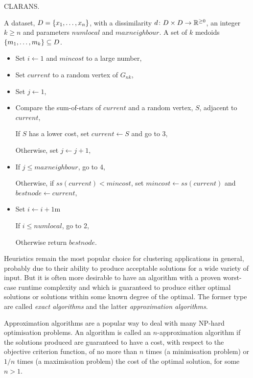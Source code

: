 \begin{algorithm}[h]
  \caption{CLARANS.}
  \label{alg:clarans}
  \begin{algorithmic}
    \Require A dataset, $D = \{x_1,\dotsc,x_n\}$, with a dissimilarity $d
             \colon D \times D \to \mathbb{R}^{\geq 0}$, an integer
             $k \geq n$ and parameters $numlocal$ and $maxneighbour$.
    \Ensure  A set of $k$ medoids $\{m_1,\dotsc,m_k\}\subseteq D$.
    \begin{itemize}
    \item Set $i \gets 1$ and $mincost$ to a large number,
    \item Set $current$ to a random vertex of $G_{nk}$,
    \item Set $j \gets 1$,
    \item Compare the sum-of-stars of $current$ and a random vertex, $S$,
      adjacent to $current$,

      If $S$ has a lower cost, set $current \gets S$ and go to 3,

      Otherwise, set $j \gets j+1$,
    \item If $j \leq maxneighbour$, go to 4,

      Otherwise, if $ss(current)<mincost$, set $mincost \gets ss(current)$ and
      $bestnode \gets current$,
    \item Set $i \gets i+1$m

      If $i \leq numlocal$, go to 2,
  
      Otherwise return $bestnode$.
    \end{itemize}
  \end{algorithmic}

\end{algorithm}

\noindent Heuristics remain the most popular choice for clustering
applications in general, probably due to their ability to produce acceptable
solutions for a wide variety of input.  But it is often more desirable to have
an algorithm with a proven worst-case runtime complexity and which is
guaranteed to produce either optimal solutions or solutions within some known
degree of the optimal.  The former type are called \textit{exact algorithms}
and the latter \textit{approximation algorithms}.

Approximation algorithms are a popular way to deal with many NP-hard
optimisation problems.  An algorithm is called an $n$-approximation algorithm
if the solutions produced are guaranteed to have a cost, with respect to the
objective criterion function, of no more than $n$ times (a minimisation
problem) or $1/n$ times (a maximisation problem) the cost of the optimal
solution, for some $n > 1$.


